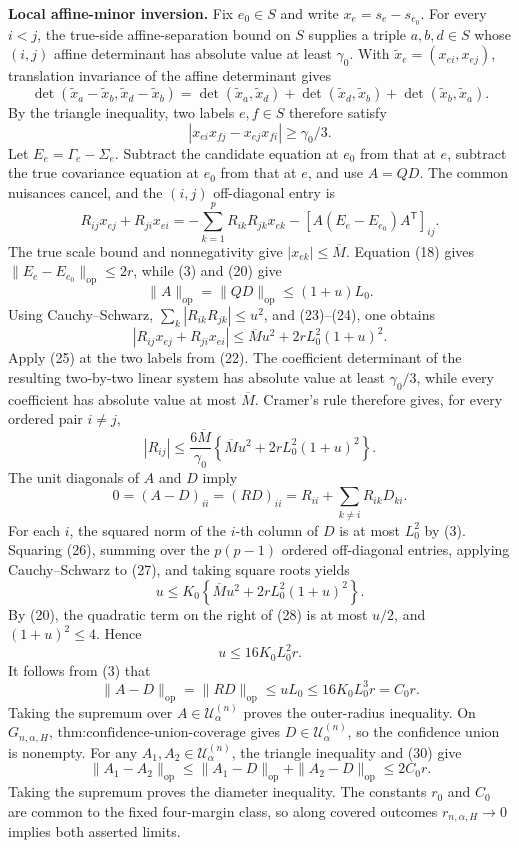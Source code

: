 \textbf{Local affine-minor inversion.}
Fix \(e_0\in S\) and write \(x_e=s_e-s_{e_0}\). For every \(i<j\), the true-side affine-separation bound on \(S\) supplies a triple \(a,b,d\in S\) whose \((i,j)\) affine determinant has absolute value at least \(\gamma_0\). With \(\widetilde x_e=(x_{ei},x_{ej})\), translation invariance of the affine determinant gives
\[
\det(\widetilde x_a-\widetilde x_b,
\widetilde x_d-\widetilde x_b)
=\det(\widetilde x_a,\widetilde x_d)
+\det(\widetilde x_d,\widetilde x_b)
+\det(\widetilde x_b,\widetilde x_a).
\tag{21}
\]
By the triangle inequality, two labels \(e,f\in S\) therefore satisfy
\[
|x_{ei}x_{fj}-x_{ej}x_{fi}|\geq\gamma_0/3.
\tag{22}
\]
Let \(E_e=\Gamma_e-\Sigma_e\). Subtract the candidate equation at \(e_0\) from that at \(e\), subtract the true covariance equation at \(e_0\) from that at \(e\), and use \(A=QD\). The common nuisances cancel, and the \((i,j)\) off-diagonal entry is
\[
R_{ij}x_{ej}+R_{ji}x_{ei}
=-\sum_{k=1}^pR_{ik}R_{jk}x_{ek}
-[A(E_e-E_{e_0})A^{\mathsf T}]_{ij}.
\tag{23}
\]
The true scale bound and nonnegativity give \(|x_{ek}|\leq\overline M\). Equation (18) gives \(\|E_e-E_{e_0}\|_{\mathrm{op}}\leq2r\), while (3) and (20) give
\[
\|A\|_{\mathrm{op}}=\|QD\|_{\mathrm{op}}
\leq(1+u)L_0.
\tag{24}
\]
Using Cauchy--Schwarz, \(\sum_k|R_{ik}R_{jk}|\leq u^2\), and (23)--(24), one obtains
\[
|R_{ij}x_{ej}+R_{ji}x_{ei}|
\leq\overline M u^2+2rL_0^2(1+u)^2.
\tag{25}
\]
Apply (25) at the two labels from (22). The coefficient determinant of the resulting two-by-two linear system has absolute value at least \(\gamma_0/3\), while every coefficient has absolute value at most \(\overline M\). Cramer's rule therefore gives, for every ordered pair \(i\neq j\),
\[
|R_{ij}|
\leq\frac{6\overline M}{\gamma_0}
\left\{\overline M u^2+2rL_0^2(1+u)^2\right\}.
\tag{26}
\]
The unit diagonals of \(A\) and \(D\) imply
\[
0=(A-D)_{ii}=(RD)_{ii}
=R_{ii}+\sum_{k\neq i}R_{ik}D_{ki}.
\tag{27}
\]
For each \(i\), the squared norm of the \(i\)-th column of \(D\) is at most \(L_0^2\) by (3). Squaring (26), summing over the \(p(p-1)\) ordered off-diagonal entries, applying Cauchy--Schwarz to (27), and taking square roots yields
\[
u\leq K_0
\left\{\overline M u^2+2rL_0^2(1+u)^2\right\}.
\tag{28}
\]
By (20), the quadratic term on the right of (28) is at most \(u/2\), and \((1+u)^2\leq4\). Hence
\[
u\leq16K_0L_0^2r.
\tag{29}
\]
It follows from (3) that
\[
\|A-D\|_{\mathrm{op}}
=\|RD\|_{\mathrm{op}}
\leq uL_0
\leq16K_0L_0^3r
=C_0r.
\tag{30}
\]
Taking the supremum over \(A\in\mathcal U^{(n)}_\alpha\) proves the outer-radius inequality. On \(G_{n,\alpha,H}\), \(\text{thm:confidence-union-coverage}\) gives \(D\in\mathcal U^{(n)}_\alpha\), so the confidence union is nonempty. For any \(A_1,A_2\in\mathcal U^{(n)}_\alpha\), the triangle inequality and (30) give
\[
\|A_1-A_2\|_{\mathrm{op}}
\leq\|A_1-D\|_{\mathrm{op}}+\|A_2-D\|_{\mathrm{op}}
\leq2C_0r.
\]
Taking the supremum proves the diameter inequality. The constants \(r_0\) and \(C_0\) are common to the fixed four-margin class, so along covered outcomes \(r_{n,\alpha,H}\to0\) implies both asserted limits.